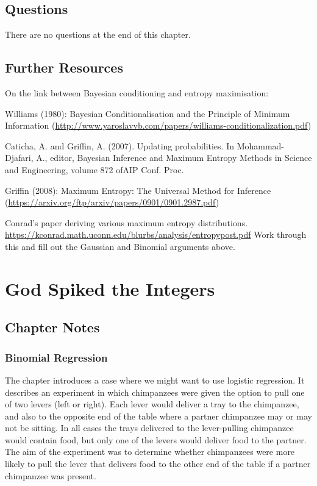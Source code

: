 \documentclass[
]{book}
\begin{document}
\hypertarget{questions-9}{%
\section{Questions}\label{questions-9}}

There are no questions at the end of this chapter.

\hypertarget{further-resources}{%
\section*{Further Resources}\label{further-resources}}

On the link between Bayesian conditioning and entropy maximisation:

Williams (1980): Bayesian Conditionalisation and the Principle of Minimum Information (\url{http://www.yaroslavvb.com/papers/williams-conditionalization.pdf})

Caticha, A. and Griffin, A. (2007). Updating probabilities. In Mohammad-Djafari, A., editor, Bayesian Inference and Maximum Entropy Methods in Science and Engineering, volume 872 ofAIP Conf. Proc.

Griffin (2008): Maximum Entropy: The Universal Method for Inference (\url{https://arxiv.org/ftp/arxiv/papers/0901/0901.2987.pdf})

Conrad's paper deriving various maximum entropy distributions. \url{https://kconrad.math.uconn.edu/blurbs/analysis/entropypost.pdf}
Work through this and fill out the Gaussian and Binomial arguments above.

\hypertarget{god_spiked}{%
\chapter{God Spiked the Integers}\label{god_spiked}}

\hypertarget{chapter-notes-10}{%
\section{Chapter Notes}\label{chapter-notes-10}}

\hypertarget{binomial-regression}{%
\subsection*{Binomial Regression}\label{binomial-regression}}

The chapter introduces a case where we might want to use logistic regression. It describes an experiment in which chimpanzees were given the option to pull one of two levers (left or right). Each lever would deliver a tray to the chimpanzee, and also to the opposite end of the table where a partner chimpanzee may or may not be sitting. In all cases the trays delivered to the lever-pulling chimpanzee would contain food, but only one of the levers would deliver food to the partner. The aim of the experiment was to determine whether chimpanzees were more likely to pull the lever that delivers food to the other end of the table if a partner chimpanzee was present.
\end{document}
